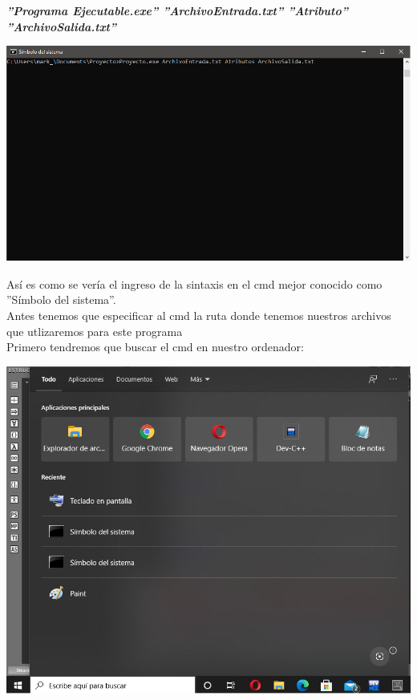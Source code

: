 \documentclass[12pt,letterpaper]{report}
\begin{document}
\textbf{\textit{ ''Programa Ejecutable.exe''  ''ArchivoEntrada.txt''  ''Atributo''  ''ArchivoSalida.txt'' }}\\

\begin{center}
\includegraphics[scale=0.5]{Sintaxis}
\end{center}
Así es como se vería el ingreso de la sintaxis en el cmd mejor conocido como ''Símbolo del sistema''. \\
Antes tenemos que especificar al cmd la ruta donde tenemos nuestros archivos que utlizaremos para este programa\\
Primero tendremos que buscar el cmd en nuestro ordenador:\\

\begin{center}
\includegraphics[scale=0.35]{ruta01}
\end{center}
\end{document}
